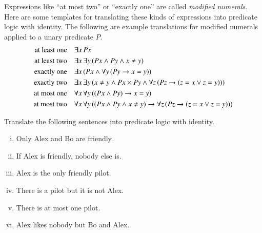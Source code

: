 \documentclass[nobib,nofonts]{tufte-handout}
\begin{document}
Expressions like ``at most two'' or ``exactly one'' are called \emph{modified numerals}.
Here are some templates for translating these kinds of expressions into predicate logic with identity.
The following are example translations for modified numerals applied to a unary predicate $P$.
\begin{align*}
  \text{at least one} &&& \exists x \thinspace Px \\
  \text{at least two} &&& \exists x \thinspace  \exists y \thinspace (Px \wedge Py \wedge x \neq y) \\
  \text{exactly one}  &&& \exists x \thinspace (Px \wedge \forall y \thinspace (Py \rightarrow x = y) )\\
  \text{exactly two}  &&& \exists x \thinspace \exists y \thinspace (x \neq y \wedge Px \times Py \wedge \forall z \thinspace (Pz \rightarrow (z = x \vee z = y))) \\
  \text{at most one}  &&& \forall x \thinspace \forall y \thinspace ((Px \wedge Py) \rightarrow x = y) \\
  \text{at most two}  &&& \forall x \thinspace \forall y \thinspace ((Px \wedge Py \wedge x \neq y) \rightarrow \forall z \thinspace (Pz \rightarrow (z =x \vee z = y)) )
\end{align*}


\bigskip
\noindent \colorbox{mygray}{\centering
  \begin{minipage}{1.0\textwidth}

    \begin{exercise}
      Translate the following sentences into predicate logic with identity.
      \begin{enumerate}[(i)]
        \item Only Alex and Bo are friendly.
        \item If Alex is friendly, nobody else is.
        \item Alex is the only friendly pilot.
        \item There is a pilot but it is not Alex.
        \item There is at most one pilot.
        \item Alex likes nobody but Bo and Alex.
      \end{enumerate}
    \end{exercise}

  \end{minipage}
}
\end{document}

